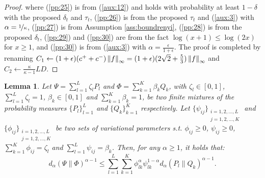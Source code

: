 \documentclass{article}
\newtheorem{lemma}{Lemma}
\begin{document}
\begin{proof}
	where (\ref{pp:25}) is from (\ref{aux:12}) and holds with probability at least $1-\delta$ with the proposed $\delta_t$ and $\tau_t$, (\ref{pp:26}) is from the proposed $\tau_t$ and (\ref{aux:3}) with $\alpha=\nicefrac{1}{\kappa}$,  (\ref{pp:27}) is from Assumption \ref{ass:boundrenyi}, (\ref{pp:28}) is from the proposed $\delta_t$, (\ref{pp:29}) and (\ref{pp:30}) are from the fact $\log(x+1)\leq\log(2x)$ for $x\geq 1$, and (\ref{pp:30}) is from (\ref{aux:3}) with $\alpha=\frac{\epsilon}{1+\epsilon}$. The proof is completed by renaming ${C_1\gets(1+\epsilon)(c^{+}+c^{-})\norm[\infty]{f} = (1+\epsilon)(2\sqrt{2}+\frac{5}{3})\norm[\infty]{f}}$ and $C_2\gets\frac{\kappa}{\kappa-1}LD$.
\end{proof}

\begin{lemma}
	Let $\Psi = \sum_{l=1}^L \zeta_l P_l$ and $\Phi = \sum_{k=1}^K \beta_k Q_k$, with $\zeta_l \in [0,1]$, $\sum_{l=1}^L \zeta_l =1$, $\beta_k \in [0,1]$ and $\sum_{k=1}^K \beta_k =1$, be two finite mixtures of the probability measures $\{P_l\}_{l=1}^L$ and $\{Q_k\}_{k=1}^K$ respectively. Let $\{ \psi_{ij} \}_{\substack{i=1,2,...,L \\ j=1,2,...,K}}$ and $\{ \phi_{ij} \}_{\substack{i=1,2,...,L \\ j=1,2,...,K}}$ be two sets of variational parameters s.t. $\phi_{ij} \ge 0$, $\psi_{ij} \ge 0$, $\sum_{k=1}^K \phi_{ij}=\zeta_l$ and $\sum_{l=1}^L \psi_{ij}=\beta_k$. Then, for any $\alpha \ge 1$, it holds that: 
     \begin{equation*}
        d_{\alpha} (\Psi \| \Phi)^{\alpha-1} \le \sum_{l=1}^L \sum_{k=1}^K \phi_{lk}^\alpha \psi_{lk}^{1-\alpha} d_{\alpha} (P_l \| Q_k)^{\alpha-1}.
    \end{equation*}
\end{lemma}
\end{document}
